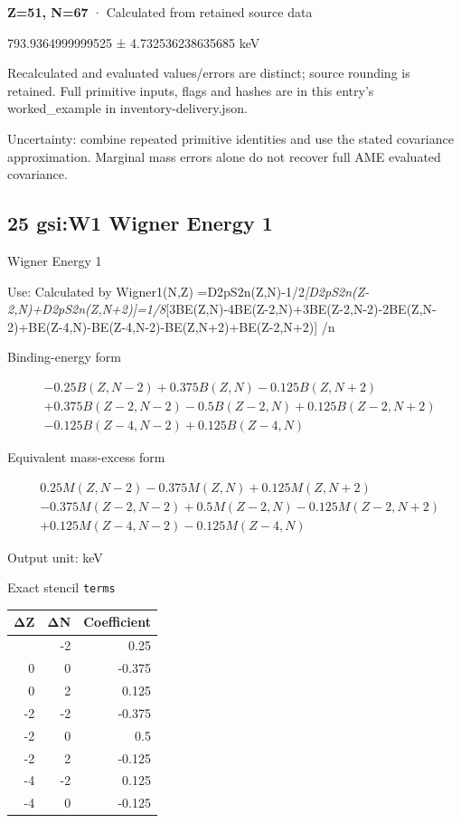 \documentclass[
  11pt,
  letterpaper,
]{article}
\begin{document}
\textbf{Z=51, N=67} · Calculated from retained source data

793.9364999999525 ± 4.732536238635685 keV

Recalculated and evaluated values/errors are distinct; source rounding
is retained. Full primitive inputs, flags and hashes are in this entry's
worked\_example in inventory-delivery.json.

Uncertainty: combine repeated primitive identities and use the stated
covariance approximation. Marginal mass errors alone do not recover full
AME evaluated covariance.

\subsection{25 gsi:W1 Wigner Energy 1}\label{gsiw1-wigner-energy-1}

Wigner Energy 1

Use: Calculated by Wigner1(N,Z)
=D2pS2n(Z,N)-1/2\emph{{[}D2pS2n(Z-2,N)+D2pS2n(Z,N+2){]}=1/8}{[}3BE(Z,N)-4BE(Z-2,N)+3BE(Z-2,N-2)-2BE(Z,N-2)+BE(Z-4,N)-BE(Z-4,N-2)-BE(Z,N+2)+BE(Z-2,N+2){]}
/n

Binding-energy form

\[
\begin{aligned}
& -0.25B(Z,N-2)+0.375B(Z,N)-0.125B(Z,N+2) \\
& +0.375B(Z-2,N-2)-0.5B(Z-2,N)+0.125B(Z-2,N+2) \\
& -0.125B(Z-4,N-2)+0.125B(Z-4,N)
\end{aligned}
\]

Equivalent mass-excess form

\[
\begin{aligned}
& 0.25M(Z,N-2)-0.375M(Z,N)+0.125M(Z,N+2) \\
& -0.375M(Z-2,N-2)+0.5M(Z-2,N)-0.125M(Z-2,N+2) \\
& +0.125M(Z-4,N-2)-0.125M(Z-4,N)
\end{aligned}
\]

Output unit: keV

Exact stencil \texttt{terms}

\begin{longtable}[]{@{}rrr@{}}
\toprule\noalign{}
ΔZ & ΔN & Coefficient \\
\midrule\noalign{}
\endhead
\bottomrule\noalign{}
\endlastfoot
0 & -2 & 0.25 \\
0 & 0 & -0.375 \\
0 & 2 & 0.125 \\
-2 & -2 & -0.375 \\
-2 & 0 & 0.5 \\
-2 & 2 & -0.125 \\
-4 & -2 & 0.125 \\
-4 & 0 & -0.125 \\
\end{longtable}
\end{document}
